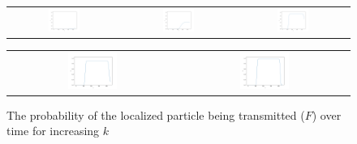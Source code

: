 \documentclass[letterpaper,12pt]{article}
\begin{document}
    \begin{figure}[H]
        \centering
        \begin{tabular}{ccc}
            \includegraphics[width=0.3\textwidth]{F8.png}
            &
            \includegraphics[width=0.3\textwidth]{F20.png}
            &
            \includegraphics[width=0.3\textwidth]{F50.png}
        \end{tabular}
        \begin{tabular}{cc}
            \includegraphics[width=0.3\textwidth]{F55.png}
            &
            \includegraphics[width=0.3\textwidth]{F65.png}
        \end{tabular}
        \caption[Transmission Probabilities]{The probability of the localized
        particle being transmitted ($F$) over time for increasing $k$}
        \label{fig:Fanim}
    \end{figure}
\end{document}
